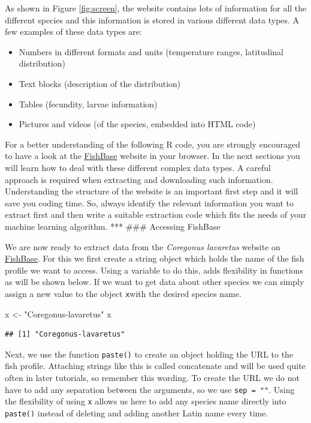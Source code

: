 \documentclass[
]{book}
\newenvironment{Shaded}{\begin{snugshade}}{\end{snugshade}}
\newcommand{\NormalTok}[1]{#1}
\newcommand{\StringTok}[1]{\textcolor[rgb]{0.31,0.60,0.02}{#1}}
\providecommand{\tightlist}{%
  \setlength{\itemsep}{0pt}\setlength{\parskip}{0pt}}
\begin{document}
As shown in Figure \ref{fig:screen}, the website contains lots of information for all the different species and this information is stored in various different data types. A few examples of these data types are:

\begin{itemize}
\tightlist
\item
  Numbers in different formats and units (temperature ranges, latitudinal distribution)
\item
  Text blocks (description of the distribution)
\item
  Tables (fecundity, larvae information)
\item
  Pictures and videos (of the species, embedded into HTML code)
\end{itemize}

For a better understanding of the following R code, you are strongly encouraged to have a look at the \href{https://fishbase.de}{FishBase} website in your browser. In the next sections you will learn how to deal with these different complex data types. A careful approach is required when extracting and downloading such information. Understanding the structure of the website is an important first step and it will save you coding time. So, always identify the relevant information you want to extract first and then write a suitable extraction code which fits the needs of your machine learning algorithm.
***
\#\#\# Accessing FishBase

We are now ready to extract data from the \emph{Coregonus lavaretus} website on \href{https://fishbase.de}{FishBase}. For this we first create a string object which holds the name of the fish profile we want to access. Using a variable to do this, adds flexibility in functions as will be shown below. If we want to get data about other species we can simply assign a new value to the object \texttt{x}with the desired species name.

\begin{Shaded}
\begin{Highlighting}[]
\NormalTok{x <-}\StringTok{ "Coregonus-lavaretus"}
\NormalTok{x}
\end{Highlighting}
\end{Shaded}

\begin{verbatim}
## [1] "Coregonus-lavaretus"
\end{verbatim}

Next, we use the function \texttt{paste()} to create an object holding the URL to the fish profile. Attaching strings like this is called concatenate and will be used quite often in later tutorials, so remember this wording. To create the URL we do not have to add any separation between the arguments, so we use \texttt{sep\ =\ ""}. Using the flexibility of using \texttt{x} allows us here to add any species name directly into \texttt{paste()} instead of deleting and adding another Latin name every time.
\end{document}
